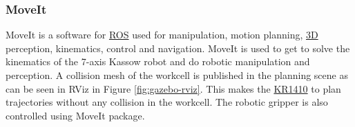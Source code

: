 \subsubsection{MoveIt}
\label{subsubsec:moveit}
MoveIt is a software for \hyperref[acro:ROS]{ROS} used for manipulation, motion planning, \hyperref[acro:3D]{3D} perception, kinematics, control and navigation. \cite{moveit}
MoveIt is used to get to solve the kinematics of the 7-axis Kassow robot and do robotic manipulation and perception.
A collision mesh of the workcell is published in the planning scene as can be seen in RViz in Figure \ref{fig:gazebo-rviz}.
This makes the \hyperref[acro:KR]{KR1410} to plan trajectories without any collision in the workcell. The robotic gripper is also controlled using MoveIt package.
